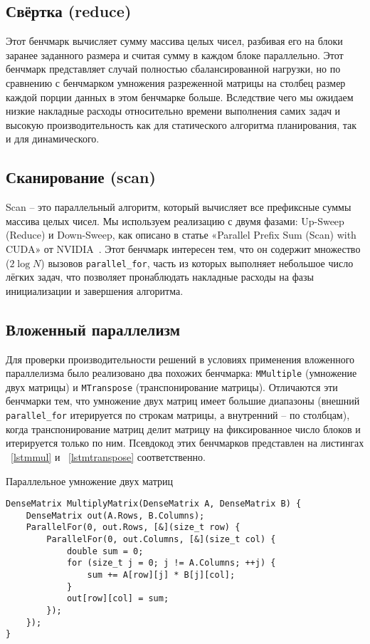 \documentclass[times,specification,annotation]{itmo-student-thesis}
\begin{document}
\subsection{Свёртка (reduce)}
Этот бенчмарк вычисляет сумму массива целых чисел, разбивая его на блоки заранее заданного размера и считая сумму в каждом блоке параллельно. Этот бенчмарк представляет случай полностью сбалансированной нагрузки, но по сравнению с бенчмарком умножения разреженной матрицы на столбец размер каждой порции данных в этом бенчмарке больше. 
Вследствие чего мы ожидаем низкие накладные расходы относительно времени выполнения самих задач и высокую производительность как для статического алгоритма планирования, так и для динамического.

\subsection{Сканирование (scan)}
Scan -- это параллельный алгоритм, который вычисляет все префиксные суммы массива целых чисел.
Мы используем реализацию с двумя фазами: Up-Sweep (Reduce) и Down-Sweep, как описано в статье «Parallel Prefix Sum (Scan) with CUDA» от NVIDIA~\cite{nvidia-scan}.
Этот бенчмарк интересен тем, что он содержит множество ($2\log {N}$) вызовов \texttt{parallel\_for}, часть из которых выполняет небольшое число лёгких задач, что позволяет пронаблюдать накладные расходы на фазы инициализации и завершения алгоритма.

\subsection{Вложенный параллелизм}
Для проверки производительности решений в условиях применения вложенного параллелизма было реализовано два похожих бенчмарка: \texttt{MMultiple} (умножение двух матрицы) и \texttt{MTranspose} (транспонирование матрицы).
Отличаются эти бенчмарки тем, что умножение двух матриц имеет большие диапазоны (внешний \texttt{parallel\_for} итерируется по строкам матрицы, а внутренний -- по столбцам), когда транспонирование матриц делит матрицу на фиксированное число блоков и итерируется только по ним. 
Псевдокод этих бенчмарков представлен на листингах ~\ref{lstmmul} и ~\ref{lstmtranspose} соответственно.

\begin{algorithm}[!h]
\caption{Параллельное умножение двух матриц}\label{lstmmul}
\begin{lstlisting}
DenseMatrix MultiplyMatrix(DenseMatrix A, DenseMatrix B) {
    DenseMatrix out(A.Rows, B.Columns);
    ParallelFor(0, out.Rows, [&](size_t row) {
        ParallelFor(0, out.Columns, [&](size_t col) {
            double sum = 0;
            for (size_t j = 0; j != A.Columns; ++j) {
                sum += A[row][j] * B[j][col];
            }
            out[row][col] = sum;
        });
    });
}
\end{lstlisting}
\end{algorithm}
\end{document}
